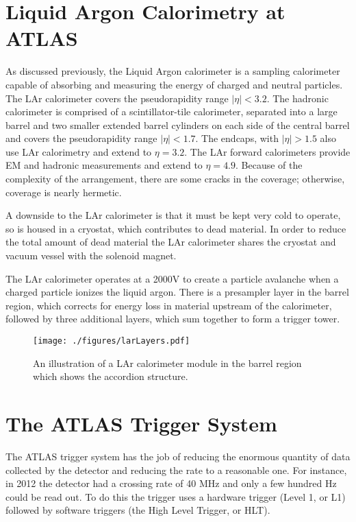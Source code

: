 \section{Liquid Argon Calorimetry at ATLAS}

As discussed previously, the Liquid Argon calorimeter is a sampling calorimeter capable of absorbing and measuring the energy of charged and neutral particles.  The LAr calorimeter covers the pseudorapidity range $|\eta| < 3.2$.  The hadronic calorimeter is comprised of a scintillator-tile calorimeter, separated into a large barrel and two smaller extended barrel cylinders on each side of the central barrel and covers the pseudorapidity range $|\eta| < 1.7$.  The endcaps, with $|\eta| > 1.5$ also use LAr calorimetry and extend to $\eta = 3.2$.  The LAr forward calorimeters provide EM and hadronic measurements and extend to $\eta = 4.9$.  Because of the complexity of the arrangement, there are some cracks in the coverage; otherwise, coverage is nearly hermetic.  

A downside to the LAr calorimeter is that it must be kept very cold to operate, so is housed in a cryostat, which contributes to dead material.  In order to reduce the total amount of dead material the LAr calorimeter shares the cryostat and vacuum vessel with the solenoid magnet.  

The LAr calorimeter operates at a 2000V to create a particle avalanche when a charged particle ionizes the liquid argon.  There is a presampler layer in the barrel region, which corrects for energy loss in material upstream of the calorimeter, followed by three additional layers, which sum together to form a trigger tower.

\begin{figure}[h!]
  \centering
	\texttt{[image: ./figures/larLayers.pdf]}
\caption{\label{fig:larLayout}{ An illustration of a LAr calorimeter module in the barrel region which shows the accordion structure. }} %
\end{figure}



\section{The ATLAS Trigger System}

The ATLAS trigger system has the job of reducing the enormous quantity of data collected by the detector and reducing the rate to a reasonable one.  For instance, in 2012 the detector had a crossing rate of 40 MHz and only a few hundred Hz could be read out.  To do this the trigger uses a hardware trigger (Level 1, or L1) followed by software triggers (the High Level Trigger, or HLT).  

